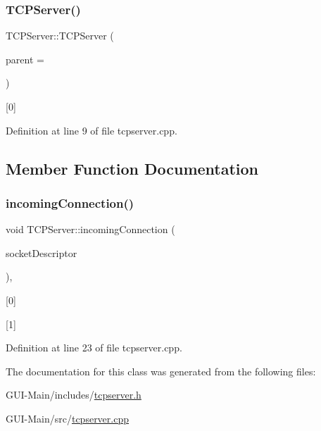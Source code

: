 \subsubsection{\texorpdfstring{T\+C\+P\+Server()}{TCPServer()}}
{\footnotesize\ttfamily T\+C\+P\+Server\+::\+T\+C\+P\+Server (\begin{DoxyParamCaption}\item[{Q\+Object $\ast$}]{parent = {} }\end{DoxyParamCaption})}



\mbox{[}0\mbox{]} 



Definition at line 9 of file tcpserver.\+cpp.



\subsection{Member Function Documentation}
\mbox{\label{classTCPServer_af1df9d80f25034148ed588e7fa2d4ab7}} 
\subsubsection{\texorpdfstring{incoming\+Connection()}{incomingConnection()}}
{\footnotesize\ttfamily void T\+C\+P\+Server\+::incoming\+Connection (\begin{DoxyParamCaption}\item[{qintptr}]{socket\+Descriptor }\end{DoxyParamCaption})\hspace{0.3cm}{\ttfamily [override]}, {\ttfamily [protected]}}



\mbox{[}0\mbox{]} 

\mbox{[}1\mbox{]} 

Definition at line 23 of file tcpserver.\+cpp.



The documentation for this class was generated from the following files\+:\begin{DoxyCompactItemize}
\item 
G\+U\+I-\/\+Main/includes/\hyperlink{tcpserver_8h}{tcpserver.\+h}\item 
G\+U\+I-\/\+Main/src/\hyperlink{tcpserver_8cpp}{tcpserver.\+cpp}\end{DoxyCompactItemize}
